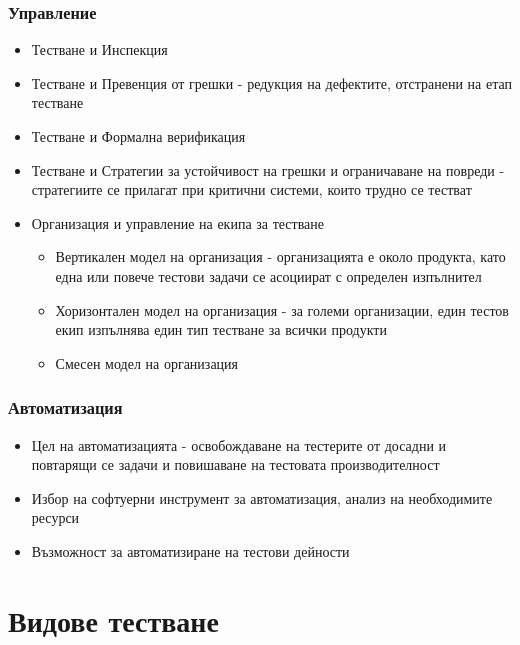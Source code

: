 \documentclass[fleqn,12pt]{article}
\begin{document}
\begin{flushleft}
    \subsubsection{Управление}
        \begin{itemize}
            \item Тестване и Инспекция
            \item Тестване и Превенция от грешки - редукция на дефектите, отстранени на етап тестване
            \item Тестване и Формална верификация
            \item Тестване и Стратегии за устойчивост на грешки и ограничаване на повреди - стратегиите се прилагат при критични системи, които трудно се тестват
            \item Организация и управление на екипа за тестване
                \begin{itemize}
                    \item Вертикален модел на организация - организацията е около продукта, като една или повече тестови задачи се асоциират с определен изпълнител
                    \item Хоризонтален модел на организация - за големи организации, един тестов екип изпълнява един тип тестване за всички продукти
                    \item Смесен модел на организация
                \end{itemize}
        \end{itemize}
    \subsubsection{Автоматизация}
        \begin{itemize}
            \item Цел на автоматизацията - освобождаване на тестерите от досадни и повтарящи се задачи и повишаване на тестовата производителност
            \item Избор на софтуерни инструмент за автоматизация, анализ на необходимите ресурси
            \item Възможност за автоматизиране на тестови дейности
        \end{itemize}

\section{Видове тестване}

\end{flushleft}
\end{document}
